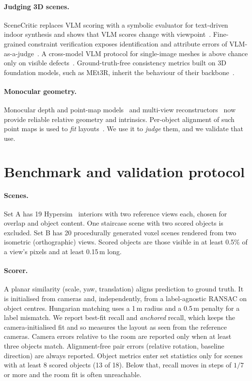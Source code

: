 \documentclass[10pt,twocolumn]{article}
\begin{document}
\paragraph{Judging 3D scenes.} SceneCritic replaces VLM scoring with a symbolic evaluator for text-driven indoor synthesis and shows that
VLM scores change with viewpoint~\cite{scenecritic}. Fine-grained constraint verification exposes identification and attribute errors of
VLM-as-a-judge~\cite{apples}. A cross-model VLM protocol for single-image meshes is above chance only on visible defects~\cite{crossmodeljudge}.
Ground-truth-free consistency metrics built on 3D foundation models, such as MEt3R, inherit the behaviour of their backbone~\cite{oneScene}.
\paragraph{Monocular geometry.} Monocular depth and point-map models~\cite{dav2,moge2} and multi-view reconstructors~\cite{dust3r} now
provide reliable relative geometry and intrinsics. Per-object alignment of such point maps is used to \emph{fit} layouts~\cite{furnset,mirascene,easy3dfy}.
We use it to \emph{judge} them, and we validate that use.

\section{Benchmark and validation protocol}\label{sec:bench}
\paragraph{Scenes.} Set A has 19 Hypersim~\cite{hypersim} interiors with two reference views each, chosen for overlap and object
content. One staircase scene with two scored objects is excluded. Set B has 20 procedurally generated voxel scenes rendered from two
isometric (orthographic) views. Scored objects are those visible in at least 0.5\% of a view's pixels and at least 0.15\,m long.
\paragraph{Scorer.} A planar similarity (scale, yaw, translation) aligns prediction to ground truth. It is initialised from cameras and,
independently, from a label-agnostic RANSAC on object centres. Hungarian matching uses a 1\,m radius and a 0.5\,m penalty for a label
mismatch. We report best-fit recall and \emph{anchored} recall, which keeps the camera-initialised fit and so measures the layout as seen
from the reference cameras. Camera errors relative to the room are reported only when at least three objects match. Alignment-free
pair errors (relative rotation, baseline direction) are always reported. Object metrics enter set statistics only for scenes with at
least 8 scored objects (13 of 18). Below that, recall moves in steps of $1/7$ or more and the room fit is often unreachable.
\end{document}
